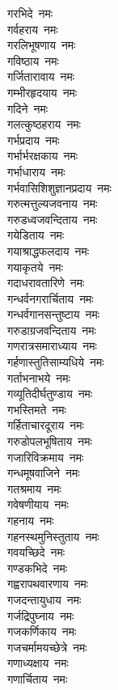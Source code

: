 \begin{flushleft}
\begin{multicols}{2}
गरभिदे~नमः\\
गर्वहराय~नमः\\
गरलिभूषणाय~नमः\\
गविष्ठाय~नमः\\
गर्जितारावाय~नमः\\
गम्भीरहृदयाय~नमः\\
गदिने~नमः\\
गलत्कुष्ठहराय~नमः\\
गर्भप्रदाय~नमः\\
गर्भार्भरक्षकाय~नमः\hfill{}\\
गर्भाधाराय~नमः\\
गर्भवासिशिशुज्ञानप्रदाय~नमः\\
गरुत्मत्तुल्यजवनाय~नमः\\
गरुडध्वजवन्दिताय~नमः\\
गयेडिताय~नमः\\
गयाश्राद्धफलदाय~नमः\\
गयाकृतये~नमः\\
गदाधरावतारिणे~नमः\\
गन्धर्वनगरार्चिताय~नमः\\
गन्धर्वगानसन्तुष्टाय~नमः\hfill{}\\
गरुडाग्रजवन्दिताय~नमः\\
गणरात्रसमाराध्याय~नमः\\
गर्हणास्तुतिसाम्यधिये~नमः\\
गर्ताभनाभये~नमः\\
गव्यूतिदीर्घतुण्डाय~नमः\\
गभस्तिमते~नमः\\
गर्हिताचारदूराय~नमः\\
गरुडोपलभूषिताय~नमः\\
गजारिविक्रमाय~नमः\\
गन्धमूषवाजिने~नमः\hfill{}\\
गतश्रमाय~नमः\\
गवेषणीयाय~नमः\\
गहनाय~नमः\\
गहनस्थमुनिस्तुताय~नमः\\
गवयच्छिदे~नमः\\
गण्डकभिदे~नमः\\
गह्वरापथवारणाय~नमः\\
गजदन्तायुधाय~नमः\\
गर्जद्रिपुघ्नाय~नमः\\
गजकर्णिकाय~नमः\hfill{}\\
गजचर्मामयच्छेत्रे~नमः\\
गणाध्यक्षाय~नमः\\
गणार्चिताय~नमः\\

\end{multicols}
\end{flushleft}
